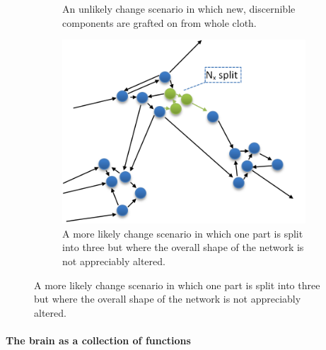 \begin{figure}
\begin{subfigure}[t]{0.45\textwidth}
		\caption{An unlikely change scenario in which new, discernible components are grafted on from whole cloth.}
		\label{fig:unlikelyEvolution}
	\end{subfigure}
	\begin{subfigure}[t]{0.45\textwidth}
		\includegraphics[width=\textwidth]{figs/likelyEvolution.png}
		\caption{A more likely change scenario in which one part is split into three but where the overall shape of the network is not appreciably altered.}
		\label{fig:likelyEvolution}
	\end{subfigure}
\end{figure}

\paragraph{The brain as a collection of functions}

